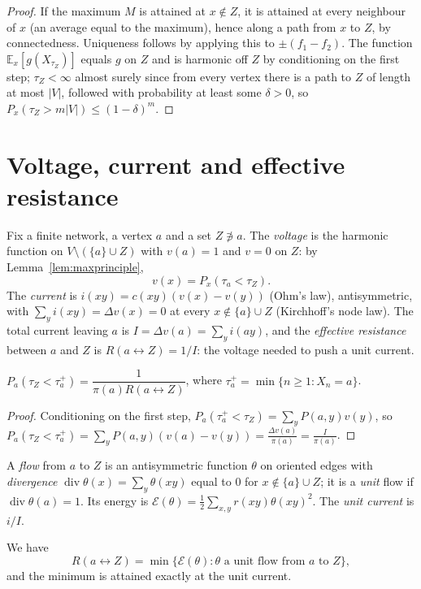 \begin{proof}
If the maximum $M$ is attained at $x\notin Z$, it is attained at every neighbour of $x$ (an average equal to the maximum), hence along a path from $x$ to $Z$, by connectedness. Uniqueness follows by applying this to
$\pm(f_1-f_2)$. The function $\mathbb E_x[g(X_{\tau_Z})]$ equals $g$ on $Z$ and is harmonic off $Z$ by conditioning on the first step; $\tau_Z<\infty$ almost surely since from every vertex there is a path to $Z$ of length at most
$|V|$, followed with probability at least some $\delta>0$, so $P_x(\tau_Z>m|V|)\le(1-\delta)^m$.
\end{proof}

\section{Voltage, current and effective resistance}

Fix a finite network, a vertex $a$ and a set $Z\not\ni a$. The \emph{voltage} is the harmonic function on $V\setminus(\{a\}\cup Z)$ with $v(a)=1$ and $v=0$ on $Z$: by Lemma~\ref{lem:maxprinciple},
\[
v(x)=P_x(\tau_a<\tau_Z) .
\]
The \emph{current} is $i(xy)=c(xy)(v(x)-v(y))$ (Ohm's law), antisymmetric, with $\sum_yi(xy)=\Delta v(x)=0$ at every $x\notin\{a\}\cup Z$ (Kirchhoff's node law). The total current leaving $a$ is
$I=\Delta v(a)=\sum_yi(ay)$, and the \emph{effective resistance} between $a$ and $Z$ is $R(a\leftrightarrow Z)=1/I$: the voltage needed to push a unit current.

\begin{proposition}\label{prop:escape}
$P_a(\tau_Z<\tau_a^+)=\dfrac1{\pi(a)R(a\leftrightarrow Z)}$, where $\tau_a^+=\min\{n\ge1:X_n=a\}$.
\end{proposition}

\begin{proof}
Conditioning on the first step, $P_a(\tau_a^+<\tau_Z)=\sum_yP(a,y)v(y)$, so $P_a(\tau_Z<\tau_a^+)=\sum_yP(a,y)(v(a)-v(y))=\frac{\Delta v(a)}{\pi(a)}=\frac I{\pi(a)}$.
\end{proof}

A \emph{flow} from $a$ to $Z$ is an antisymmetric function $\theta$ on oriented edges with \emph{divergence} $\operatorname{div}\theta(x)=\sum_y\theta(xy)$ equal to $0$ for $x\notin\{a\}\cup Z$; it is a \emph{unit} flow if $\operatorname{div}\theta(a)=1$. Its energy is
$\mathcal E(\theta)=\frac12\sum_{x,y}r(xy)\theta(xy)^2$. The \emph{unit current} is $i/I$.

\begin{theorem}\label{thm:thomson}
We have
\[
R(a\leftrightarrow Z)=\min\{\mathcal E(\theta):\theta\text{ a unit flow from }a\text{ to }Z\},
\]
and the minimum is attained exactly at the unit current.
\end{theorem}

